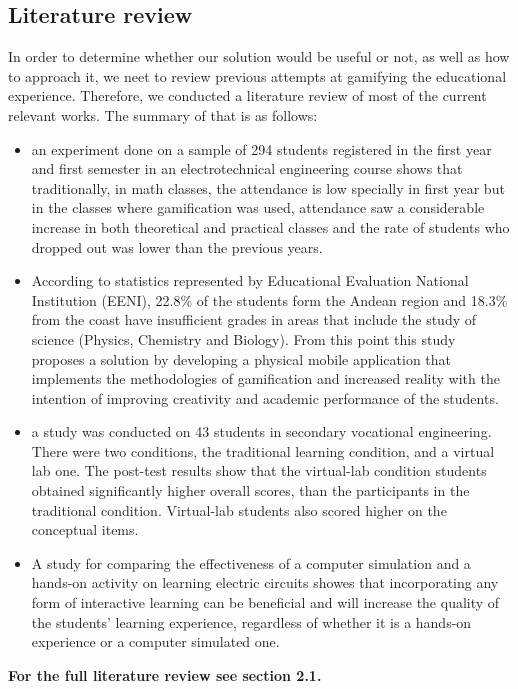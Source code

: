\documentclass[twoside,a4paper,11pt]{article}
\begin{document}
\begin{multicols}{2}
\subsection{Literature review}
In order to determine whether our solution would be useful or not, as well as how to approach it, we neet to review previous attempts at gamifying the educational experience. Therefore, we conducted a literature review of most of the current relevant works. The summary of that is as follows: \\
\begin{itemize}
    \item an experiment done on a sample of 294 students registered in the first year and first semester in an electrotechnical engineering course shows that traditionally, in math classes, the attendance
    is low specially in first year but in the classes where gamification was used, attendance saw a considerable increase in both theoretical and practical classes and the rate of students who dropped out was lower than
    the previous years. \cite{26}
    \item According to statistics represented by Educational Evaluation National Institution (EENI), 22.8\% of the students form the Andean region and 18.3\% from the coast have insufficient grades in areas that include the study of science (Physics, Chemistry and Biology). From this point
    this study proposes a solution by developing a physical mobile application that implements the methodologies of gamification and increased reality with the intention of improving creativity and
    academic performance of the students. \cite{27}
    \item a study was conducted on 43 students in secondary vocational engineering. There were two conditions, the traditional
    learning condition, and a virtual lab one. The post-test results show that the virtual-lab condition students obtained significantly higher overall
    scores, than the participants in the traditional condition. Virtual-lab students also scored higher on the conceptual items. \cite{25}
    \item A study for comparing the effectiveness of a computer simulation
    and a hands-on activity on learning electric circuits showes that incorporating any form of interactive learning can be beneficial
    and will increase the quality of the students’ learning experience, regardless of whether it is a hands-on experience or a computer simulated one. \cite{24}
\end{itemize}
\textbf{For the full literature review see \cite{29} section 2.1.}

\end{multicols}
\end{document}
